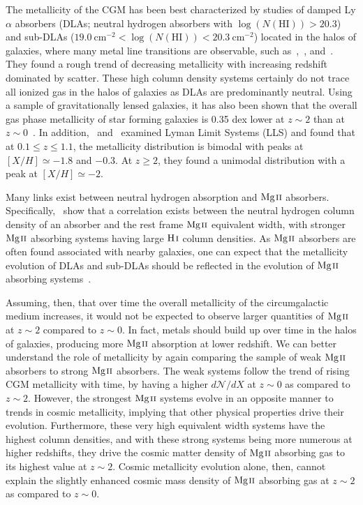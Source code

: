 The metallicity of the CGM has been best characterized by studies of damped Ly$\alpha$ absorbers (DLAs; neutral hydrogen absorbers with $\log(N(\mathrm{HI})) > 20.3$) and sub-DLAs ($19.0~\mathrm{cm^{-2}} < \log(N(\mathrm{HI})) < 20.3~\mathrm{cm^{-2}}$) located in the halos of galaxies, where many metal line transitions are observable, such as~\cite{Rafelski2012},~\cite{Quiret2016}, and~\cite{Jorgenson2013}. They found a rough trend of decreasing metallicity with increasing redshift dominated by scatter. These high column density systems certainly do not trace all ionized gas in the halos of galaxies as DLAs are predominantly neutral. Using a sample of gravitationally lensed galaxies, it has also been shown that the overall gas phase metallicity of star forming galaxies is 0.35 dex lower at $z \sim 2$ than at $z \sim 0$~\citep{Yuan2013}. In addition,~\cite{Wotta2016} and~\cite{Lehner2016} examined Lyman Limit Systems (LLS) and found that at $0.1 \le z \le 1.1$, the metallicity distribution is bimodal with peaks at $[X/H] \simeq -1.8$ and $-0.3$. At $z \ge 2$, they found a unimodal distribution with a peak at $[X/H] \simeq -2$.

Many links exist between neutral hydrogen absorption and ${\hbox{{\rm Mg}\kern 0.1em{\sc ii}}}$ absorbers. Specifically,~\cite{Menard2009} show that a correlation exists between the neutral hydrogen column density of an absorber and the rest frame ${\hbox{{\rm Mg}\kern 0.1em{\sc ii}}}$ equivalent width, with stronger ${\hbox{{\rm Mg}\kern 0.1em{\sc ii}}}$ absorbing systems having large ${\hbox{{\rm H}\kern 0.1em{\sc i}}}$ column densities. As ${\hbox{{\rm Mg}\kern 0.1em{\sc ii}}}$ absorbers are often found associated with nearby galaxies, one can expect that the metallicity evolution of DLAs and sub-DLAs should be reflected in the evolution of ${\hbox{{\rm Mg}\kern 0.1em{\sc ii}}}$ absorbing systems~\citep{Kulkarni2002,Prochaska2003,Kulkarni2005,Kulkarni2007}.

Assuming, then, that over time the overall metallicity of the circumgalactic medium increases, it would not be expected to observe larger quantities of ${\hbox{{\rm Mg}\kern 0.1em{\sc ii}}}$ at $z \sim 2$ compared to $z \sim 0$. In fact, metals should build up over time in the halos of galaxies, producing more ${\hbox{{\rm Mg}\kern 0.1em{\sc ii}}}$ absorption at lower redshift. We can better understand the role of metallicity by again comparing the sample of weak ${\hbox{{\rm Mg}\kern 0.1em{\sc ii}}}$ absorbers to strong ${\hbox{{\rm Mg}\kern 0.1em{\sc ii}}}$ absorbers. The weak systems follow the trend of rising CGM metallicity with time, by having a higher $d\mathcal{N}\!/dX$ at $z \sim 0$ as compared to $z \sim 2$. However, the strongest ${\hbox{{\rm Mg}\kern 0.1em{\sc ii}}}$ systems evolve in an opposite manner to trends in cosmic metallicity, implying that other physical properties drive their evolution. Furthermore, these very high equivalent width systems have the highest column densities, and with these strong systems being more numerous at higher redshifts, they drive the cosmic matter density of ${\hbox{{\rm Mg}\kern 0.1em{\sc ii}}}$ absorbing gas to its highest value at $z \sim 2$. Cosmic metallicity evolution alone, then, cannot explain the slightly enhanced cosmic mass density of ${\hbox{{\rm Mg}\kern 0.1em{\sc ii}}}$ absorbing gas at $z \sim 2$ as compared to $z \sim 0$.

